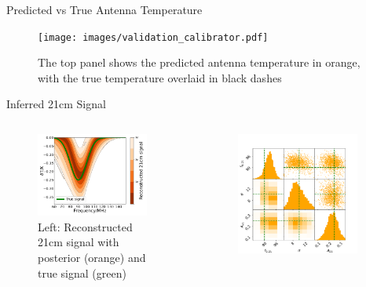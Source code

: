 \documentclass[aspectratio=169]{beamer}
\begin{document}
\begin{frame}{\small{Predicted vs True Antenna Temperature}}
	\begin{figure}
		\centering
		\texttt{[image: images/validation\_calibrator.pdf]}
		\caption{The top panel shows the predicted antenna temperature in orange, with the true temperature overlaid in black dashes}
	\end{figure}
\end{frame}

\begin{frame}{\small{Inferred 21cm Signal}}
	\begin{columns}
		\begin{column}{0.48\textwidth}
			\begin{figure}
				\centering
				\includegraphics[width=0.9\textwidth]{images/signal_comparison.pdf}
				\caption{\tiny Left: Reconstructed 21cm signal with posterior (orange) and true signal (green)}
			\end{figure}
		\end{column}
		\begin{column}{0.48\textwidth}
			\begin{figure}
				\centering
				\includegraphics[width=0.9\textwidth]{images/signal_triangle_plot.pdf}

\end{figure}
\end{column}
\end{columns}
\end{frame}
\end{document}
